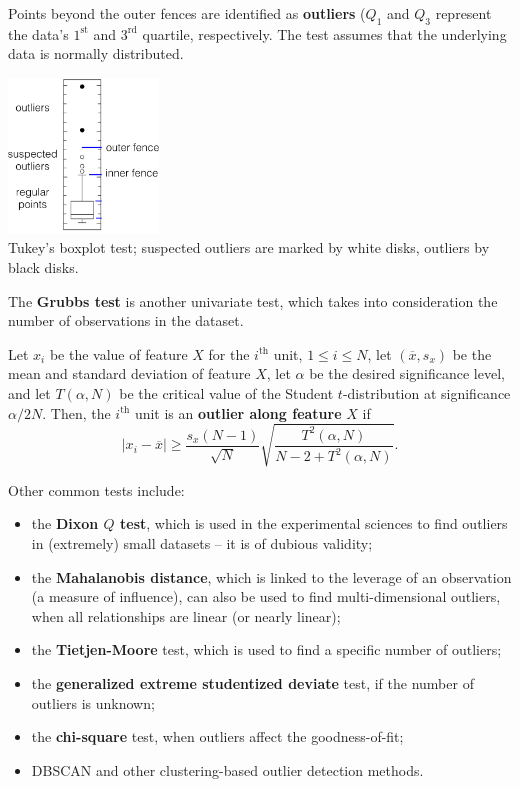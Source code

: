 \documentclass[20pt,landscape,footrule,headrule]{foils}
\begin{document}
Points beyond the outer fences are identified as \textbf{outliers} ($Q_1$ and $Q_3$ represent the data's   $1^{\textrm{st}}$ and $3^{\textrm{rd}}$ quartile, respectively. The test assumes that the underlying data is normally distributed. 


\begin{center}
\includegraphics[width=0.30\textwidth]{Images/boxplot_EN.png}
\\
Tukey's boxplot test; suspected outliers are marked by white disks, outliers by black disks.
\end{center}


The \textbf{Grubbs test} is another univariate test, which takes into consideration the number of observations in the dataset. 

Let $x_i$ be the value of feature $X$ for the $i^{\textrm{th}}$ unit, $1\leq i\leq N$, let $(\overline{x},s_x)$ be the mean and standard deviation of feature $X$, let $\alpha$ be the desired significance level, and let  $T(\alpha,N)$ be the critical value of the Student $t$-distribution at significance $\alpha/2N$. Then, the $i^{\textrm{th}}$ unit is an \textbf{outlier along feature} $X$ if $$|x_i-\overline{x}| \geq \frac{s_x(N-1)}{\sqrt{N}}\sqrt{\frac{T^2(\alpha,N)}{N-2+T^2(\alpha,N)}}.$$


Other common tests include:
\begin{itemize}

\item the \textbf{Dixon $Q$ test}, which is used in the experimental sciences to find outliers in (extremely) small datasets -- it is of dubious validity;

\item the \textbf{Mahalanobis distance}, which is linked to the leverage of an observation (a measure of influence), can also be used to find multi-dimen\-sio\-nal outliers, when all relationships are linear (or nearly linear);

\item the \textbf{Tietjen-Moore} test, which is used to find a specific number of outliers;

\item the \textbf{generalized extreme studentized deviate} test, if the number of outliers is unknown; 

\item the \textbf{chi-square} test, when outliers affect the goodness-of-fit;

\item DBSCAN and other clustering-based outlier detection methods.

\end{itemize}
\end{document}
